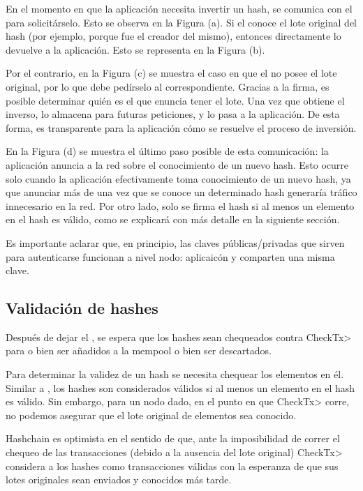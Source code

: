 %
En el momento en que la aplicación necesita invertir un hash, se comunica con el \collector
para solicitárselo. Esto se observa en la Figura (a).
%
Si el \collector conoce el lote original del hash (por ejemplo, porque fue el \collector creador
del mismo), entonces directamente lo devuelve a la aplicación. Esto se representa en la Figura (b).
%

Por el contrario, en la Figura (c) se muestra el caso en que el \collector no posee el lote original,
por lo que debe pedírselo al \collector correspondiente. Gracias a la firma, es posible determinar
quién es el \collector que enuncia tener el lote. Una vez que obtiene el inverso, lo almacena para
futuras peticiones, y lo pasa a la aplicación. De esta forma, es transparente para la aplicación
cómo se resuelve el proceso de inversión.

%

En la Figura (d) se muestra el último paso posible de esta comunicación: la aplicación
anuncia a la red sobre el conocimiento de un nuevo hash. Esto ocurre solo cuando la aplicación
efectivamente toma conocimiento de un nuevo hash, ya que anunciar más de una vez que se conoce un
determinado hash generaría tráfico innecesario en la red. Por otro lado, solo se firma el hash si al
menos un elemento en el hash es válido, como se explicará con más detalle en la siguiente sección.

%

Es importante aclarar que, en principio, las claves públicas/privadas que sirven para autenticarse
funcionan a nivel nodo: aplicaicón y \collector comparten una misma clave.

\subsection{Validación de hashes}

Después de dejar el \collector, se espera que los hashes sean chequeados contra \<CheckTx>
para o bien ser añadidos a la mempool o bien ser descartados.

%
Para determinar la validez de un hash se necesita chequear los elementos en él. Similar a
\compresschain, los hashes son considerados válidos si al menos un elemento
en el hash es válido.
%
Sin embargo, para un nodo dado, en el punto en que \<CheckTx> corre, no podemos asegurar que el
lote original de elementos sea conocido.

%
Hashchain es optimista en el sentido de que, ante la imposibilidad de correr el chequeo
de las transacciones (debido a la ausencia del lote original) \<CheckTx> considera a los
hashes como transacciones válidas con la esperanza de que sus lotes originales sean enviados
y conocidos más tarde. 

